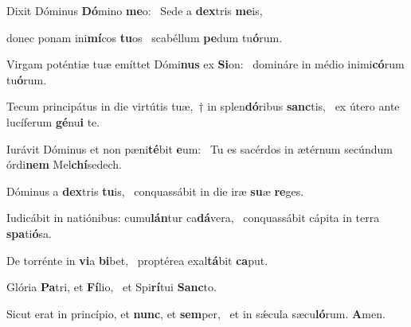 \item Dixit Dóminus \textbf{Dó}mino \textbf{me}o:~\psstar{} Sede a \textbf{dex}tris \textbf{me}is,

\item donec ponam ini\textbf{mí}cos \textbf{tu}os~\psstar{} scabéllum \textbf{pe}dum tu\textbf{ó}rum.

\item Virgam poténtiæ tuæ emíttet Dómi\textbf{nus} ex \textbf{Si}on:~\psstar{} domináre in médio inimi\textbf{có}rum tu\textbf{ó}rum.

\item Tecum principátus in die virtútis tuæ,~† in splen\textbf{dó}ribus \textbf{sanc}tis,~\psstar{} ex útero ante lucíferum \textbf{gé}nu\textbf{i} te.

\item Iurávit Dóminus et non pæni\textbf{té}bit \textbf{e}um:~\psstar{} Tu es sacérdos in ætérnum secúndum órdi\textbf{nem} Mel\textbf{chí}sedech.

\item Dóminus a \textbf{dex}tris \textbf{tu}is,~\psstar{} conquassábit in die iræ \textbf{su}æ \textbf{re}ges.

\item Iudicábit in natiónibus: cumu\textbf{lán}tur ca\textbf{dá}vera,~\psstar{} conquassábit cápita in terra \textbf{spa}ti\textbf{ó}sa.

\item De torrénte in \textbf{vi}a \textbf{bi}bet,~\psstar{} proptérea exal\textbf{tá}bit \textbf{ca}put.

\item Glória \textbf{Pa}tri, et \textbf{Fí}lio,~\psstar{} et Spi\textbf{rí}tui \textbf{Sanc}to.

\item Sicut erat in princípio, et \textbf{nunc}, et \textbf{sem}per,~\psstar{} et in sǽcula sæcu\textbf{ló}rum. \textbf{A}men.